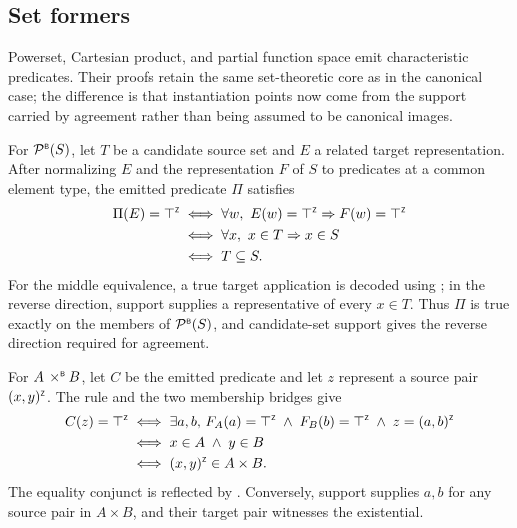\subsection{Set formers}
\label{sec:beer-case-set-formers}

Powerset, Cartesian product, and partial function space emit characteristic predicates.
Their proofs retain the same set-theoretic core as in the canonical case; the difference is that instantiation points now come from the support carried by agreement rather than being assumed to be canonical images.

For \(\mathord{\mathcal{P}^{\scriptscriptstyle{\mathsf{B}}}}(S)\), let \(T\) be a candidate source set and \(E\) a related target representation.
After normalizing \(E\) and the representation \(F\) of \(S\) to predicates at a common element type, the emitted predicate \(\Pi\) satisfies
\[
  \begin{aligned}
    \Pi(E)=\top^{\scriptscriptstyle{\mathsf{Z}}}
    &\iff
      \forall w,\ E(w)=\top^{\scriptscriptstyle{\mathsf{Z}}}\Rightarrow F(w)=\top^{\scriptscriptstyle{\mathsf{Z}}}\\
    &\iff
      \forall x,\ x\in T\Rightarrow x\in S\\
    &\iff T\subseteq S.
  \end{aligned}
\]
For the middle equivalence, a true target application is decoded using ; in the reverse direction, support supplies a representative of every \(x\in T\).
Thus \(\Pi\) is true exactly on the members of \(\mathord{\mathcal{P}^{\scriptscriptstyle{\mathsf{B}}}}(S)\), and candidate-set support gives the reverse direction required for agreement.

For \(A\mathbin{\,\times^{\scriptscriptstyle{\mathsf{B}}}} B\), let \(C\) be the emitted predicate and let \(z\) represent a source pair \(\lparen x, y\rparen^{\scriptscriptstyle{\mathsf{Z}}}\).
The  rule and the two membership bridges give
\[
  \begin{aligned}
    C(z)=\top^{\scriptscriptstyle{\mathsf{Z}}}
    &\iff
      \exists a,b,\,
      F_A(a)=\top^{\scriptscriptstyle{\mathsf{Z}}}\;\land\; F_B(b)=\top^{\scriptscriptstyle{\mathsf{Z}}}
      \;\land\; z=\lparen a, b\rparen^{\scriptscriptstyle{\mathsf{Z}}}\\
    &\iff x\in A\;\land\; y\in B\\
    &\iff \lparen x, y\rparen^{\scriptscriptstyle{\mathsf{Z}}}\in A\times B.
  \end{aligned}
\]
The equality conjunct is reflected by .
Conversely, support supplies \(a,b\) for any source pair in \(A\times B\), and their target pair witnesses the existential.


